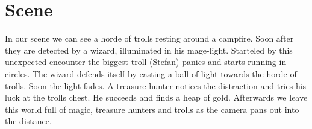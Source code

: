 \section{Scene} \label{sec:scene}
In our scene we can see a horde of trolls resting around a campfire. Soon after they are detected by a wizard, illuminated in his mage-light. Starteled by this unexpected encounter the biggest troll (Stefan) panics and starts running in circles. The wizard defends itself by casting a ball of light towards the horde of trolls. Soon the light fades. A treasure hunter notices the distraction and tries his luck at the trolls chest. He succeeds and finds a heap of gold. Afterwards we leave this world full of magic, treasure hunters and trolls as the camera pans out into the distance.